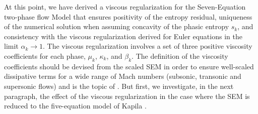 \documentclass[preprint,10pt]{elsarticle}
\begin{document}
%
At this point, we have derived a viscous regularization for the Seven-Equation two-phase flow Model that ensures positivity of the 
entropy residual, uniqueness of the numerical solution when assuming concavity of the phasic entropy $s_k$, and consistency with 
the viscous regularization derived for Euler equations \cite{jlg, Marco_paper_low_mach} in the limit $\alpha_k \to 1$. The viscous 
regularization involves a set of three positive viscosity coefficients for each phase, $\mu_k$, $\kappa_k$, and $\beta_k$. The definition 
of the viscosity coefficients should be devised from the scaled SEM in order to ensure well-scaled dissipative terms for a wide range 
of Mach numbers (subsonic, transonic and supersonic flows) and is the topic of . But first, we investigate, in the 
next paragraph, the effect of the viscous regularization in the case where the SEM is reduced to the five-equation model of 
Kapila \cite{Kapila_2001}.
%
\end{document}

